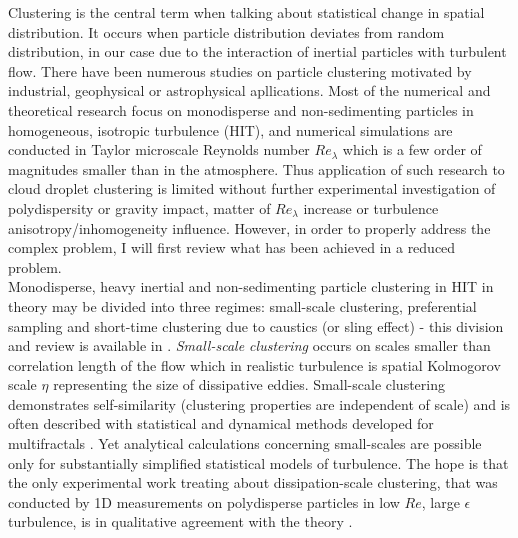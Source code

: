\documentclass[../main.tex]{subfiles}
\begin{document}
Clustering is the central term when talking about statistical change in spatial distribution. It occurs when particle distribution deviates from random distribution, in our case due to the interaction of inertial particles with turbulent flow. There have been numerous studies on particle clustering motivated by industrial, geophysical or astrophysical apllications. Most of the numerical and theoretical research focus on monodisperse and non-sedimenting particles in homogeneous, isotropic turbulence (HIT), and numerical simulations are conducted in Taylor microscale Reynolds number $Re_{\lambda}$ which is a few order of magnitudes smaller than in the atmosphere. Thus  application of such research to cloud droplet clustering is limited without further experimental investigation of polydispersity or gravity impact, matter of $Re_{\lambda}$ increase or turbulence anisotropy/inhomogeneity influence. However, in order to properly address the complex problem, I will first review what has been achieved in a reduced problem.\\
Monodisperse, heavy inertial and non-sedimenting particle clustering in HIT in theory may be divided into three regimes: small-scale clustering, preferential sampling and short-time clustering due to caustics (or sling effect) - this division and review is available in \citet{Gustavsson2016}. \emph{Small-scale clustering} occurs on scales smaller than correlation length of the flow which in realistic turbulence is spatial Kolmogorov scale $\eta$ representing the size of dissipative eddies. Small-scale clustering demonstrates self-similarity (clustering properties are independent of scale) and is often described with statistical and dynamical methods developed for multifractals \citep{Falkovich2003, Bec2005, Bec2006b, Bec2007, Bragg2014}. Yet analytical calculations concerning small-scales are possible only for substantially simplified statistical models of turbulence. The hope is that the only experimental work treating about dissipation-scale clustering, that was conducted by 1D measurements on polydisperse particles in low $Re$, large $\epsilon$ turbulence, is in qualitative agreement with the theory \citep{Saw2008}.\\
\end{document}
